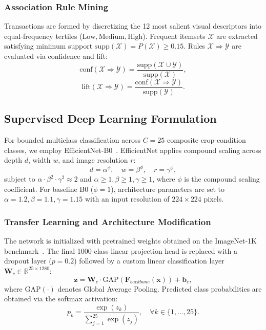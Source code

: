 \documentclass[conference,a4paper]{IEEEtran}
\begin{document}
\subsubsection{Association Rule Mining}
Transactions are formed by discretizing the 12 most salient visual descriptors into equal-frequency tertiles ($\text{Low}, \text{Medium}, \text{High}$). Frequent itemsets $\mathcal{X}$ are extracted satisfying minimum support $\text{supp}(\mathcal{X}) = P(\mathcal{X}) \ge 0.15$. Rules $\mathcal{X} \Rightarrow \mathcal{Y}$ are evaluated via confidence and lift:
\begin{equation}
\text{conf}(\mathcal{X} \Rightarrow \mathcal{Y}) = \frac{\text{supp}(\mathcal{X} \cup \mathcal{Y})}{\text{supp}(\mathcal{X})},
\end{equation}
\begin{equation}
\text{lift}(\mathcal{X} \Rightarrow \mathcal{Y}) = \frac{\text{conf}(\mathcal{X} \Rightarrow \mathcal{Y})}{\text{supp}(\mathcal{Y})}.
\end{equation}

\subsection{Supervised Deep Learning Formulation}
For bounded multiclass classification across $C=25$ composite crop-condition classes, we employ EfficientNet-B0~\cite{tan2019efficientnet}. EfficientNet applies compound scaling across depth $d$, width $w$, and image resolution $r$:
\begin{equation}
d = \alpha^\phi, \quad w = \beta^\phi, \quad r = \gamma^\phi,
\end{equation}
subject to $\alpha \cdot \beta^2 \cdot \gamma^2 \approx 2$ and $\alpha \ge 1, \beta \ge 1, \gamma \ge 1$, where $\phi$ is the compound scaling coefficient. For baseline B0 ($\phi=1$), architecture parameters are set to $\alpha=1.2, \beta=1.1, \gamma=1.15$ with an input resolution of $224\times 224$ pixels.

\subsubsection{Transfer Learning and Architecture Modification}
The network is initialized with pretrained weights obtained on the ImageNet-1K benchmark~\cite{deng2009imagenet}. The final 1000-class linear projection head is replaced with a dropout layer ($p=0.2$) followed by a custom linear classification layer $\mathbf{W}_c \in \mathbb{R}^{25 \times 1280}$:
\begin{equation}
\mathbf{z} = \mathbf{W}_c \cdot \text{GAP}(\mathbf{F}_{backbone}(\mathbf{x})) + \mathbf{b}_c,
\end{equation}
where $\text{GAP}(\cdot)$ denotes Global Average Pooling. Predicted class probabilities are obtained via the softmax activation:
\begin{equation}
p_k = \frac{\exp(z_k)}{\sum_{j=1}^{25} \exp(z_j)}, \quad \forall k \in \{1, \dots, 25\}.
\end{equation}
\end{document}

